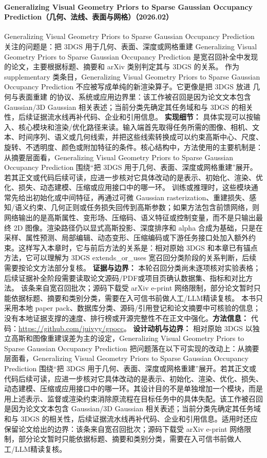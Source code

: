 \paragraph{Generalizing Visual Geometry Priors to Sparse Gaussian Occupancy Prediction（几何、法线、表面与网格）（2026.02）}
Generalizing Visual Geometry Priors to Sparse Gaussian Occupancy Prediction~\cite{2602_21552} 关注的问题是：把 3DGS 用于几何、表面、深度或网格重建 Generalizing Visual Geometry Priors to Sparse Gaussian Occupancy Prediction 是宽召回补全中发现的论文，主要根据标题、摘要和 arXiv 类别判定其与 3DGS 的关系。
作为 supplementary 类条目，Generalizing Visual Geometry Priors to Sparse Gaussian Occupancy Prediction 不应被写成单纯的新渲染算子。它更像是把 3DGS 放进 几何与表面重建 的协议、系统或应用边界里：该工作被召回是因为论文文本包含 Gaussian/3D Gaussian 相关表述；当前分类先确定其任务域和与 3DGS 的相关性，后续证据流水线再补代码、企业和引用信息。
\textbf{实现细节：} 具体实现可以按输入、核心模块和渲染/优化路径来读。输入端首先取得任务所需的图像、相机、文本、时间序列、语义或几何线索，并把这些线索转换成可以约束高斯中心、尺度、旋转、不透明度、颜色或附加特征的条件。核心结构中，方法使用的主要机制是：从摘要层面看，Generalizing Visual Geometry Priors to Sparse Gaussian Occupancy Prediction 围绕“把 3DGS 用于几何、表面、深度或网格重建”展开。若其正文或代码后续可读，应进一步核对它具体改动的是表示、初始化、渲染、优化、损失、动态建模、压缩或应用接口中的哪一环。 训练或推理时，这些模块通常先给出初始化或中间特征，再通过可微 Gaussian rasterization、重建损失、感知/语义约束、几何正则或任务损失回传到高斯参数；如果方法包含前馈网络，则网络输出的是高斯属性、变形场、压缩码、语义特征或控制变量，而不是只输出最终 2D 图像。渲染路径仍以显式高斯投影、深度排序和 alpha 合成为基础，只是在采样、属性预测、局部编辑、动态变形、压缩编码或下游任务接口处加入额外约束。这样写入本章时，它与前后方法的关系是：相对原始 3DGS 和本章已有锚点方法，它可以理解为 3DGS extends\_or\_uses 宽召回分类阶段的关系判断，后续需要按论文方法部分复核。
\textbf{证据与边界：} 本轮召回分类尚未逐项核对实验表格；后续证据补全阶段需要读取论文源码/PDF或项目页确认数据集、指标和对比方法。 该条来自宽召回批次；源码下载受 arXiv e-print 网络限制，部分论文暂时只能依据标题、摘要和类别分类，需要在入可信书前做人工/LLM精读复核。 本书只采用本地 paper pack、数据库分类、源码/引用登记和论文摘要中可核验的信息；没有本地证据支撑的速度、排行榜或开源完整性不在正文中强化。\textbf{方法信息：} 代码：\url{https://github.com/juivyy/gpocc}。
\textbf{设计动机与边界：} 相对原始 3DGS 以独立高斯和图像重建误差为主的设定，Generalizing Visual Geometry Priors to Sparse Gaussian Occupancy Prediction 把问题落在以下可实现的改动上：从摘要层面看，Generalizing Visual Geometry Priors to Sparse Gaussian Occupancy Prediction 围绕“把 3DGS 用于几何、表面、深度或网格重建”展开。若其正文或代码后续可读，应进一步核对它具体改动的是表示、初始化、渲染、优化、损失、动态建模、压缩或应用接口中的哪一环。其设计目的不是单独增加一个模块，而是用上述表示、监督或渲染约束消除原流程在目标任务中的具体失配。该工作被召回是因为论文文本包含 Gaussian/3D Gaussian 相关表述；当前分类先确定其任务域和与 3DGS 的相关性，后续证据流水线再补代码、企业和引用信息。适用时还应保留论文给出的边界：该条来自宽召回批次；源码下载受 arXiv e-print 网络限制，部分论文暂时只能依据标题、摘要和类别分类，需要在入可信书前做人工/LLM精读复核。
